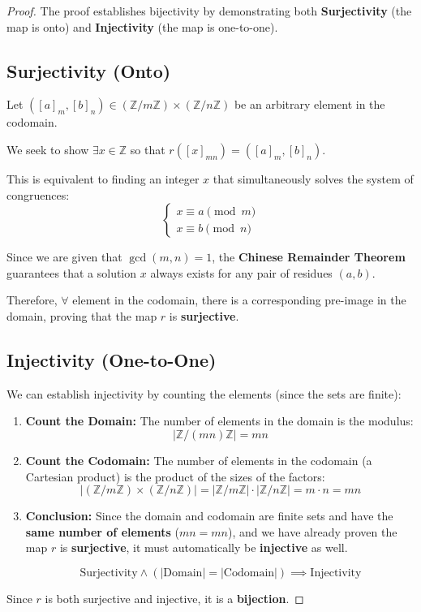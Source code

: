 \begin{proof}
    The proof establishes bijectivity by demonstrating both \textbf{Surjectivity} (the map is onto) and \textbf{Injectivity} (the map is one-to-one).

    \subsection*{Surjectivity (Onto)}
    Let $([a]_m, [b]_n) \in (\mathbb{Z}/m\mathbb{Z}) \times (\mathbb{Z}/n\mathbb{Z})$ be an arbitrary element in the codomain.
    
    We seek to show $\exists x \in \mathbb{Z}$ so that $r([x]_{mn}) = ([a]_m, [b]_n)$.
    
    This is equivalent to finding an integer $x$ that simultaneously solves the system of congruences:
    $$\begin{cases} x \equiv a \pmod{m} \\ x \equiv b \pmod{n} \end{cases}$$
    
    Since we are given that $\gcd(m, n) = 1$, the \textbf{Chinese Remainder Theorem} guarantees that a solution $x$ always exists for any pair of residues $(a, b)$.
    
    Therefore, $\forall$ element in the codomain, there is a corresponding pre-image in the domain, proving that the map $r$ is \textbf{surjective}.
    
    \subsection*{Injectivity (One-to-One)}
    We can establish injectivity by counting the elements (since the sets are finite):
    
    \begin{enumerate}
        \item \textbf{Count the Domain:} The number of elements in the domain is the modulus:
        $$|\mathbb{Z}/(mn)\mathbb{Z}| = mn$$
        
        \item \textbf{Count the Codomain:} The number of elements in the codomain (a Cartesian product) is the product of the sizes of the factors:
        $$|(\mathbb{Z}/m\mathbb{Z}) \times (\mathbb{Z}/n\mathbb{Z})| = |\mathbb{Z}/m\mathbb{Z}| \cdot |\mathbb{Z}/n\mathbb{Z}| = m \cdot n = mn$$
        
        \item \textbf{Conclusion:} Since the domain and codomain are finite sets and have the \textbf{same number of elements} ($mn = mn$), and we have already proven the map $r$ is \textbf{surjective}, it must automatically be \textbf{injective} as well.
        
        $$\text{Surjectivity} \land (|\text{Domain}| = |\text{Codomain}|) \implies \text{Injectivity}$$
    \end{enumerate}
    
    Since $r$ is both surjective and injective, it is a \textbf{bijection}.
\end{proof}


